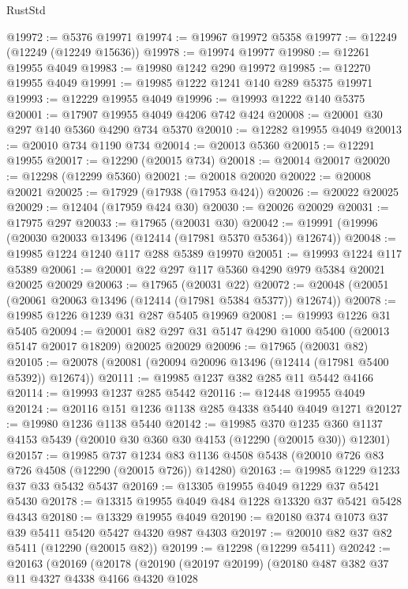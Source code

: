\begin{lexlean}{RustStd}
\begin{coremodule}
{\begin{coremodule}
{{{{{{{{{{{{{{{{{{{{{{{{{{{{{{{{{{{{{{{{{{{{{{{{{{@19972 := @5376 @19971
@19974 := @19967 @19972 @5358
@19977 := @12249 (@12249 (@12249 @15636))
@19978 := @19974 @19977
@19980 := @12261 @19955 @4049
@19983 := @19980 @1242 @290 @19972
@19985 := @12270 @19955 @4049
@19991 := @19985 @1222 @1241 @140 @289 @5375 @19971
@19993 := @12229 @19955 @4049
@19996 := @19993 @1222 @140 @5375
@20001 := @17907 @19955 @4049 @4206 @742 @424
@20008 := @20001 @30 @297 @140 @5360 @4290 @734 @5370
@20010 := @12282 @19955 @4049
@20013 := @20010 @734 @1190 @734
@20014 := @20013 @5360
@20015 := @12291 @19955
@20017 := @12290 (@20015 @734)
@20018 := @20014 @20017
@20020 := @12298 (@12299 @5360)
@20021 := @20018 @20020
@20022 := @20008 @20021
@20025 := @17929 (@17938 (@17953 @424))
@20026 := @20022 @20025
@20029 := @12404 (@17959 @424 @30)
@20030 := @20026 @20029
@20031 := @17975 @297
@20033 := @17965 (@20031 @30)
@20042 := @19991 (@19996 (@20030 @20033 @13496 (@12414 (@17981 @5370 @5364)) @12674))
@20048 := @19985 @1224 @1240 @117 @288 @5389 @19970
@20051 := @19993 @1224 @117 @5389
@20061 := @20001 @22 @297 @117 @5360 @4290 @979 @5384 @20021 @20025 @20029
@20063 := @17965 (@20031 @22)
@20072 := @20048 (@20051 (@20061 @20063 @13496 (@12414 (@17981 @5384 @5377)) @12674))
@20078 := @19985 @1226 @1239 @31 @287 @5405 @19969
@20081 := @19993 @1226 @31 @5405
@20094 := @20001 @82 @297 @31 @5147 @4290 @1000 @5400 (@20013 @5147 @20017 @18209) @20025 @20029
@20096 := @17965 (@20031 @82)
@20105 := @20078 (@20081 (@20094 @20096 @13496 (@12414 (@17981 @5400 @5392)) @12674))
@20111 := @19985 @1237 @382 @285 @11 @5442 @4166
@20114 := @19993 @1237 @285 @5442
@20116 := @12448 @19955 @4049
@20124 := @20116 @151 @1236 @1138 @285 @4338 @5440 @4049 @1271
@20127 := @19980 @1236 @1138 @5440
@20142 := @19985
    @370
    @1235
    @360
    @1137
    @4153
    @5439
    (@20010 @30 @360 @30 @4153 (@12290 (@20015 @30)) @12301)
@20157 := @19985
    @737
    @1234
    @83
    @1136
    @4508
    @5438
    (@20010 @726 @83 @726 @4508 (@12290 (@20015 @726)) @14280)
@20163 := @19985 @1229 @1233 @37 @33 @5432 @5437
@20169 := @13305 @19955 @4049 @1229 @37 @5421 @5430
@20178 := @13315 @19955 @4049 @484 @1228 @13320 @37 @5421 @5428 @4343
@20180 := @13329 @19955 @4049
@20190 := @20180 @374 @1073 @37 @39 @5411 @5420 @5427 @4320 @987 @4303
@20197 := @20010 @82 @37 @82 @5411 (@12290 (@20015 @82))
@20199 := @12298 (@12299 @5411)
@20242 := @20163
    (@20169
      (@20178
        (@20190
          (@20197 @20199)
          (@20180
            @487
            @382
            @37
            @11
            @4327
            @4338
            @4166
            @4320
            @1028
}}}}}}}}}}}}}}}}}}}}}}}}}}}}}}}}}}}}}}}}}}}}}}}}}}
\end{coremodule}}
\end{coremodule}
\end{lexlean}
